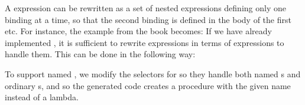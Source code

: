 \begin{exe}[4.7]
    A  expression can be rewritten as a set of nested  
    expressions defining only one binding at a time, so that the second binding 
    is defined in the body of the first  etc. For instance, the 
    example from the book becomes:
    If we have already implemented , it is sufficient to rewrite 
     expressions in terms of  expressions to handle them. 
    This can be done in the following way:
\end{exe}

\begin{exe}[4.8]
    To support named , we modify the selectors for  so they 
    handle both named s and ordinary s, and 
     so the generated code creates a procedure with the 
    given name instead of a lambda.
\end{exe}

